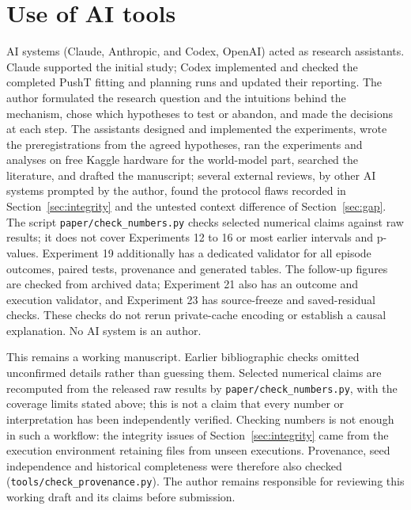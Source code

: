 \documentclass[11pt,a4paper]{article}
\begin{document}
\section*{Use of AI tools}
AI systems (Claude, Anthropic, and Codex, OpenAI) acted as research assistants. Claude supported the initial study; Codex implemented and checked the completed PushT fitting and planning runs and updated their reporting. The author formulated the research question and the intuitions behind the mechanism, chose which hypotheses to test or abandon, and made the decisions at each step. The assistants designed and implemented the experiments, wrote the preregistrations from the agreed hypotheses, ran the experiments and analyses on free Kaggle hardware for the world-model part, searched the literature, and drafted the manuscript; several external reviews, by other AI systems prompted by the author, found the protocol flaws recorded in Section~\ref{sec:integrity} and the untested context difference of Section~\ref{sec:gap}. The script \texttt{paper/check\_numbers.py} checks selected numerical claims against raw results; it does not cover Experiments 12 to 16 or most earlier intervals and p-values. Experiment 19 additionally has a dedicated validator for all episode outcomes, paired tests, provenance and generated tables. The follow-up figures are checked from archived data; Experiment 21 also has an outcome and execution validator, and Experiment 23 has source-freeze and saved-residual checks. These checks do not rerun private-cache encoding or establish a causal explanation. No AI system is an author.

This remains a working manuscript. Earlier bibliographic checks omitted unconfirmed details rather than guessing them. Selected numerical claims are recomputed from the released raw results by \texttt{paper/check\_numbers.py}, with the coverage limits stated above; this is not a claim that every number or interpretation has been independently verified. Checking numbers is not enough in such a workflow: the integrity issues of Section~\ref{sec:integrity} came from the execution environment retaining files from unseen executions. Provenance, seed independence and historical completeness were therefore also checked (\texttt{tools/check\_provenance.py}). The author remains responsible for reviewing this working draft and its claims before submission.



\end{document}
